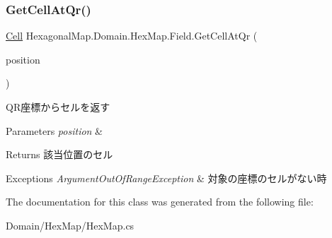 \subsubsection{\texorpdfstring{Get\+Cell\+At\+Qr()}{GetCellAtQr()}}
{\footnotesize\ttfamily \mbox{\hyperlink{class_hexagonal_map_1_1_domain_1_1_hex_map_1_1_cell}{Cell}} Hexagonal\+Map.\+Domain.\+Hex\+Map.\+Field.\+Get\+Cell\+At\+Qr (\begin{DoxyParamCaption}\item[{\mbox{\hyperlink{struct_hexagonal_map_1_1_domain_1_1_hex_map_1_1_q_r_coordinate}{Q\+R\+Coordinate}}}]{position }\end{DoxyParamCaption})\hspace{0.3cm}{\ttfamily [inline]}}



Q\+R座標からセルを返す 


\begin{DoxyParams}{Parameters}
{\em position} & \\
\hline
\end{DoxyParams}
\begin{DoxyReturn}{Returns}
該当位置のセル
\end{DoxyReturn}

\begin{DoxyExceptions}{Exceptions}
{\em Argument\+Out\+Of\+Range\+Exception} & 対象の座標のセルがない時\\
\hline
\end{DoxyExceptions}


The documentation for this class was generated from the following file\+:\begin{DoxyCompactItemize}
\item 
Domain/\+Hex\+Map/Hex\+Map.\+cs\end{DoxyCompactItemize}
